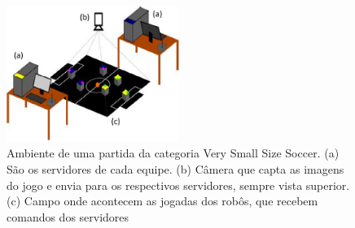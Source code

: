     \begin{figure}[H]
     \centering
     \includegraphics[width=0.50\textwidth]{./fig/ambiente_vsss.png}
    
     \caption{Ambiente de uma partida da categoria Very Small Size Soccer. (a) São os servidores de cada equipe. (b) Câmera que capta as imagens do jogo e envia para os respectivos servidores, sempre vista superior. (c) Campo onde acontecem as jogadas dos robôs, que recebem comandos dos servidores}
     \label{fig:ambiente_vsss}
    \end{figure}

    
